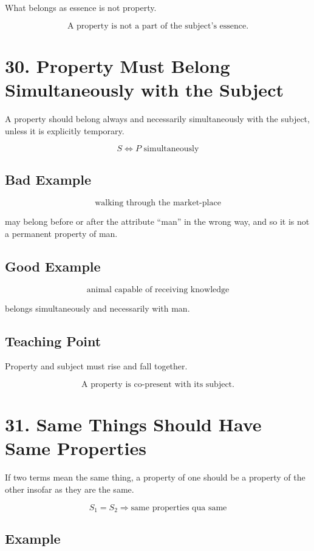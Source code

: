\documentclass[12pt]{article}
\begin{document}
What belongs as essence is not property.

\[
\boxed{
\text{A property is not a part of the subject's essence.}
}
\]

\section*{30. Property Must Belong Simultaneously with the Subject}

A property should belong always and necessarily simultaneously with the subject,
unless it is explicitly temporary.

\[
S \Leftrightarrow P \text{ simultaneously}
\]

\subsection*{Bad Example}

\[
\text{walking through the market-place}
\]

may belong before or after the attribute ``man'' in the wrong way, and so it is
not a permanent property of man.

\subsection*{Good Example}

\[
\text{animal capable of receiving knowledge}
\]

belongs simultaneously and necessarily with man.

\subsection*{Teaching Point}

Property and subject must rise and fall together.

\[
\boxed{
\text{A property is co-present with its subject.}
}
\]

\section*{31. Same Things Should Have Same Properties}

If two terms mean the same thing, a property of one should be a property of the
other insofar as they are the same.

\[
S_1 = S_2
\Rightarrow
\text{same properties qua same}
\]

\subsection*{Example}
\end{document}
